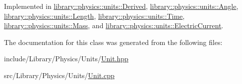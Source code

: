 Implemented in \hyperlink{classlibrary_1_1physics_1_1units_1_1_derived_a3626d6c77e6753f44232067856fde9d1}{library\+::physics\+::units\+::\+Derived}, \hyperlink{classlibrary_1_1physics_1_1units_1_1_angle_aae6b7bd4e028ea7719f5a712ca19a86c}{library\+::physics\+::units\+::\+Angle}, \hyperlink{classlibrary_1_1physics_1_1units_1_1_length_aea1d96e6930f7e6e6383e78c55219a64}{library\+::physics\+::units\+::\+Length}, \hyperlink{classlibrary_1_1physics_1_1units_1_1_time_a6f56977493a45d334bb53bc4246888c4}{library\+::physics\+::units\+::\+Time}, \hyperlink{classlibrary_1_1physics_1_1units_1_1_mass_a6e7757920752ac9f6918525d6fadb31e}{library\+::physics\+::units\+::\+Mass}, and \hyperlink{classlibrary_1_1physics_1_1units_1_1_electric_current_ab2325214012e6f50350a0dec575d877f}{library\+::physics\+::units\+::\+Electric\+Current}.



The documentation for this class was generated from the following files\+:\begin{DoxyCompactItemize}
\item 
include/\+Library/\+Physics/\+Units/\hyperlink{_units_2_unit_8hpp}{Unit.\+hpp}\item 
src/\+Library/\+Physics/\+Units/\hyperlink{_units_2_unit_8cpp}{Unit.\+cpp}\end{DoxyCompactItemize}
